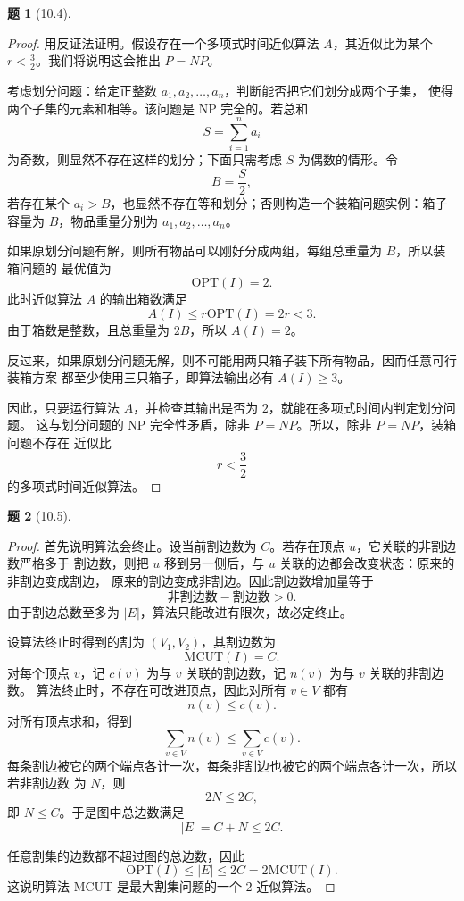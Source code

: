 \documentclass[11pt, a4paper]{article}
\newtheorem{problem}{题}
\begin{document}
\vspace{1em}

\begin{problem}[10.4]
\end{problem}

\begin{proof}
    用反证法证明。假设存在一个多项式时间近似算法 $A$，其近似比为某个
    $r<\frac{3}{2}$。我们将说明这会推出 $P=NP$。

    考虑划分问题：给定正整数 $a_1,a_2,\ldots,a_n$，判断能否把它们划分成两个子集，
    使得两个子集的元素和相等。该问题是 NP 完全的。若总和
    \[
        S=\sum_{i=1}^n a_i
    \]
    为奇数，则显然不存在这样的划分；下面只需考虑 $S$ 为偶数的情形。令
    \[
        B=\frac{S}{2},
    \]
    若存在某个 $a_i>B$，也显然不存在等和划分；否则构造一个装箱问题实例：箱子容量为
    $B$，物品重量分别为 $a_1,a_2,\ldots,a_n$。

    如果原划分问题有解，则所有物品可以刚好分成两组，每组总重量为 $B$，所以装箱问题的
    最优值为
    \[
        \mathrm{OPT}(I)=2.
    \]
    此时近似算法 $A$ 的输出箱数满足
    \[
        A(I)\le r\mathrm{OPT}(I)=2r<3.
    \]
    由于箱数是整数，且总重量为 $2B$，所以 $A(I)=2$。

    反过来，如果原划分问题无解，则不可能用两只箱子装下所有物品，因而任意可行装箱方案
    都至少使用三只箱子，即算法输出必有 $A(I)\ge 3$。

    因此，只要运行算法 $A$，并检查其输出是否为 $2$，就能在多项式时间内判定划分问题。
    这与划分问题的 NP 完全性矛盾，除非 $P=NP$。所以，除非 $P=NP$，装箱问题不存在
    近似比
    \[
        r<\frac{3}{2}
    \]
    的多项式时间近似算法。
\end{proof}

\vspace{1em}

\begin{problem}[10.5]
\end{problem}

\begin{proof}
    首先说明算法会终止。设当前割边数为 $C$。若存在顶点 $u$，它关联的非割边数严格多于
    割边数，则把 $u$ 移到另一侧后，与 $u$ 关联的边都会改变状态：原来的非割边变成割边，
    原来的割边变成非割边。因此割边数增加量等于
    \[
        \text{非割边数}-\text{割边数}>0.
    \]
    由于割边总数至多为 $|E|$，算法只能改进有限次，故必定终止。

    设算法终止时得到的割为 $(V_1,V_2)$，其割边数为
    \[
        \mathrm{MCUT}(I)=C.
    \]
    对每个顶点 $v$，记 $c(v)$ 为与 $v$ 关联的割边数，记 $n(v)$ 为与 $v$ 关联的非割边数。
    算法终止时，不存在可改进顶点，因此对所有 $v\in V$ 都有
    \[
        n(v)\le c(v).
    \]
    对所有顶点求和，得到
    \[
        \sum_{v\in V} n(v)\le \sum_{v\in V} c(v).
    \]
    每条割边被它的两个端点各计一次，每条非割边也被它的两个端点各计一次，所以若非割边数
    为 $N$，则
    \[
        2N\le 2C,
    \]
    即 $N\le C$。于是图中总边数满足
    \[
        |E|=C+N\le 2C.
    \]

    任意割集的边数都不超过图的总边数，因此
    \[
        \mathrm{OPT}(I)\le |E|\le 2C=2\mathrm{MCUT}(I).
    \]
    这说明算法 MCUT 是最大割集问题的一个 $2$ 近似算法。
\end{proof}
\end{document}
